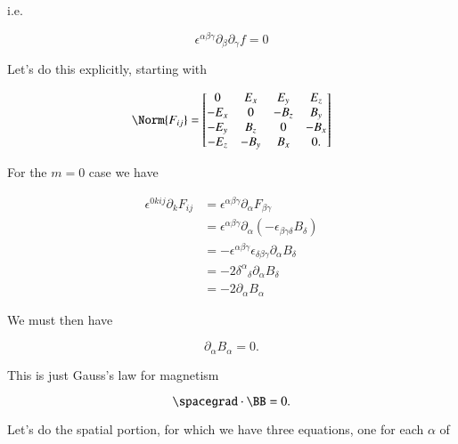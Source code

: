 i.e.

\begin{equation}\label{eqn:relativisticElectrodynamicsL11:810}
\epsilon^{\alpha\beta\gamma} \partial_\beta \partial_\gamma f = 0
\end{equation}

Let's do this explicitly, starting with

\begin{equation}\label{eqn:relativisticElectrodynamicsL11:370b}
\Norm{ F_{i j} } = 
\begin{bmatrix}
0 & E_x & E_y & E_z \\
-E_x & 0 & -B_z & B_y \\
-E_y & B_z & 0 & -B_x \\
-E_z & -B_y & B_x & 0.
\end{bmatrix}
\end{equation}

For the $m= 0$ case we have

\begin{align*}
\epsilon^{0 k i j} \partial_k F_{i j}
&=
\epsilon^{\alpha \beta \gamma} \partial_\alpha F_{\beta \gamma} \\
&= 
\epsilon^{\alpha \beta \gamma} \partial_\alpha (-\epsilon_{\beta \gamma \delta} B_\delta) \\
&= 
-\epsilon^{\alpha \beta \gamma} \epsilon_{\delta \beta \gamma }
\partial_\alpha B_\delta \\
&= 
- 2 {\delta^\alpha}_\delta \partial_\alpha B_\delta \\
&= 
- 2 \partial_\alpha B_\alpha 
\end{align*}

We must then have

\begin{equation}\label{eqn:relativisticElectrodynamicsL11:830}
\partial_\alpha B_\alpha = 0.
\end{equation}

This is just Gauss's law for magnetism

\begin{equation}\label{eqn:relativisticElectrodynamicsL11:850}
\spacegrad \cdot \BB = 0.
\end{equation}

Let's do the spatial portion, for which we have three equations, one for each $\alpha$ of

